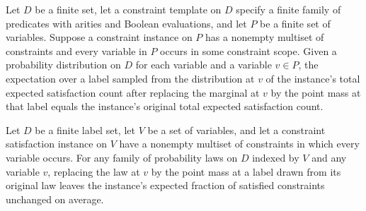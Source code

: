\begin{theorem}
\label{FABL.CSPInstance.average_localExpectedCount_replace}
\leanok
{}
Let $D$ be a finite set, let a constraint template on $D$ specify a finite family of
predicates with arities and Boolean evaluations, and let $P$ be a finite set of
variables. Suppose a constraint instance on $P$ has a nonempty multiset of constraints
and every variable in $P$ occurs in some constraint scope. Given a probability
distribution on $D$ for each variable and a variable $v\in P$, the expectation over a
label sampled from the distribution at $v$ of the instance’s total expected satisfaction
count after replacing the marginal at $v$ by the point mass at that label equals the
instance’s original total expected satisfaction count.
\end{theorem}

\begin{theorem}
\label{FABL.CSPInstance.average_localExpectedValue_replace}
\leanok
{}
Let $D$ be a finite label set, let $V$ be a set of variables, and let a constraint
satisfaction instance on $V$ have a nonempty multiset of constraints in which every
variable occurs. For any family of probability laws on $D$ indexed by $V$ and any
variable $v$, replacing the law at $v$ by the point mass at a label drawn from its
original law leaves the instance's expected fraction of satisfied constraints unchanged
on average.
\end{theorem}

